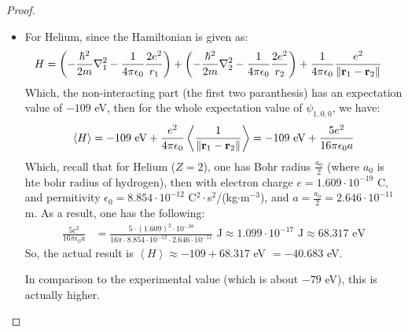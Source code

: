 \documentclass{article}
\begin{document}
\begin{proof}
\begin{itemize}
        \hfil

        \item[(b)] For Helium, since the Hamiltonian is given as:
        \begin{align}
            H &= \left(-\frac{\hbar^2}{2m}\nabla_1^2-\frac{1}{4\pi\epsilon_0}\frac{2e^2}{r_1}\right)+\left(-\frac{\hbar^2}{2m}\nabla_2^2-\frac{1}{4\pi\epsilon_0}\frac{2e^2}{r_2}\right)+\frac{1}{4\pi\epsilon_0}\frac{e^2}{\|\mathbf{r}_1-\mathbf{r}_2\|}
        \end{align}
        Which, the non-interacting part (the first two paranthesis) has an expectation value of $-109$ eV, then for the whole expectation value of $\psi_{1,0,0}$, we have:
        \begin{align}
            \left<H\right> = -109\text{ eV} + \frac{e^2}{4\pi\epsilon_0}\left<\frac{1}{\|\mathbf{r}_1-\mathbf{r}_2\|}\right> = -109\text{ eV} + \frac{5e^2}{16\pi\epsilon_0 a}
        \end{align}
        Which, recall that for Helium ($Z=2$), one has Bohr radius $\frac{a_0}{2}$ (where $a_0$ is hte bohr radius of hydrogen), then with electron charge $e = 1.609\cdot 10^{-19}$ C, and permitivity $\epsilon_0 = 8.854\cdot 10^{-12}$ C$^2\cdot$s$^2$/(kg$\cdot$m$^{-3}$), and $a = \frac{a_0}{2} = 2.646\cdot 10^{-11}$ m. As a result, one has the following:
        \begin{align}
            \frac{5e^2}{16\pi\epsilon_0 a} &= \frac{5\cdot(1.609)^2\cdot 10^{-38}}{16\pi\cdot 8.854\cdot 10^{-12}\cdot 2.646\cdot 10^{-11}}\text{ J}\approx 1.099\cdot 10^{-17}\text{ J} \approx 68.317 \text{ eV}
        \end{align}
        So, the actual result is $\left<H\right> \approx -109+68.317$ eV $=-40.683$ eV.

        In comparison to the experimental value (which is about $-79$ eV), this is actually higher.
    \end{itemize}
\end{proof}

\newpage
\end{document}
